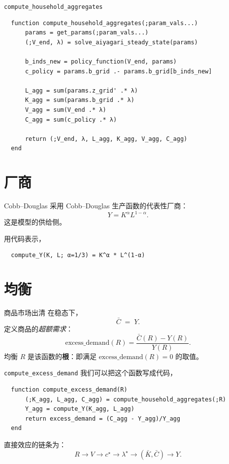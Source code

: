 \documentclass[10pt,aspectratio=169]{beamer}
\begin{document}
\begin{frame}[fragile]{\texttt{compute\_household\_aggregates}}
  \begin{lstlisting}
  function compute_household_aggregates(;param_vals...)
      params = get_params(;param_vals...)
      (;V_end, λ) = solve_aiyagari_steady_state(params)

      b_inds_new = policy_function(V_end, params)
      c_policy = params.b_grid .- params.b_grid[b_inds_new]

      L_agg = sum(params.z_grid' .* λ)
      K_agg = sum(params.b_grid .* λ)
      V_agg = sum(V_end .* λ)
      C_agg = sum(c_policy .* λ)

      return (;V_end, λ, L_agg, K_agg, V_agg, C_agg)
  end
  \end{lstlisting}
\end{frame}

\section{厂商}

\begin{frame}[fragile]{Cobb--Douglas}
  采用 Cobb--Douglas 生产函数的代表性厂商：
  \[
    Y = K^\alpha L^{1-\alpha}.
  \]
  这是模型的供给侧。

  用代码表示，
  \begin{lstlisting}
  compute_Y(K, L; α=1/3) = K^α * L^(1-α)
  \end{lstlisting}
\end{frame}

\section{均衡}

\begin{frame}{商品市场出清}
  在稳态下，
  \[
    \bar C \;=\; Y.
  \]
  定义商品的\emph{超额需求}：
  \[
    \text{excess\_demand}(R) = \frac{\bar C(R) - Y(R)}{Y(R)}.
  \]
  均衡 $R$ 是该函数的\textbf{根}：即满足 $\text{excess\_demand}(R) = 0$ 的取值。
\end{frame}

\begin{frame}[fragile]{\texttt{compute\_excess\_demand}}
  我们可以把这个函数写成代码，
  \begin{lstlisting}
  function compute_excess_demand(R)
      (;K_agg, L_agg, C_agg) = compute_household_aggregates(;R)
      Y_agg = compute_Y(K_agg, L_agg)
      return excess_demand = (C_agg - Y_agg)/Y_agg
  end
  \end{lstlisting}
  直接效应的链条为：
  \[
    R \to V \to c^\star \to \lambda^\star \to (\bar K, \bar C) \to Y.
  \]
\end{frame}
\end{document}
